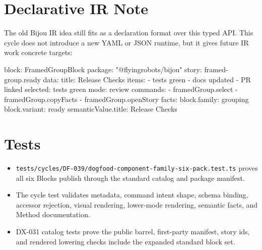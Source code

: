 \section{Declarative IR Note}\label{record-094-declarative-ir-note}

The old Bijou IR idea still fits as a declaration format over this typed API. This cycle does not introduce a new YAML or JSON runtime, but it gives future IR work concrete targets:

\begin{CodeBlock}
block: FramedGroupBlock
package: "@flyingrobots/bijou"
story: framed-group.ready
data:
  title: Release Checks
  items:
    - tests green
    - docs updated
    - PR linked
  selected: tests green
  mode: review
commands:
  - framedGroup.select
  - framedGroup.copyFacts
  - framedGroup.openStory
facts:
  block.family: grouping
  block.variant: ready
  semanticValue.title: Release Checks
\end{CodeBlock}

\section{Tests}\label{record-094-tests}

\begin{itemize}
\tightlist
\item
  \texttt{t\allowbreak{}e\allowbreak{}s\allowbreak{}t\allowbreak{}s\allowbreak{}/\allowbreak{}c\allowbreak{}y\allowbreak{}c\allowbreak{}l\allowbreak{}e\allowbreak{}s\allowbreak{}/\allowbreak{}D\allowbreak{}F\allowbreak{}-\allowbreak{}0\allowbreak{}3\allowbreak{}9\allowbreak{}/\allowbreak{}d\allowbreak{}o\allowbreak{}g\allowbreak{}f\allowbreak{}o\allowbreak{}o\allowbreak{}d\allowbreak{}-\allowbreak{}c\allowbreak{}o\allowbreak{}m\allowbreak{}p\allowbreak{}o\allowbreak{}n\allowbreak{}e\allowbreak{}n\allowbreak{}t\allowbreak{}-\allowbreak{}f\allowbreak{}a\allowbreak{}m\allowbreak{}i\allowbreak{}l\allowbreak{}y\allowbreak{}-\allowbreak{}s\allowbreak{}i\allowbreak{}x\allowbreak{}-\allowbreak{}p\allowbreak{}a\allowbreak{}c\allowbreak{}k\allowbreak{}.\allowbreak{}t\allowbreak{}e\allowbreak{}s\allowbreak{}t\allowbreak{}.\allowbreak{}t\allowbreak{}s} proves all six Blocks publish through the standard catalog and package manifest.
\item
  The cycle test validates metadata, command intent shape, schema binding, accessor rejection, visual rendering, lower-mode rendering, semantic facts, and Method documentation.
\item
  DX-031 catalog tests prove the public barrel, first-party manifest, story ids, and rendered lowering checks include the expanded standard block set.
\end{itemize}

